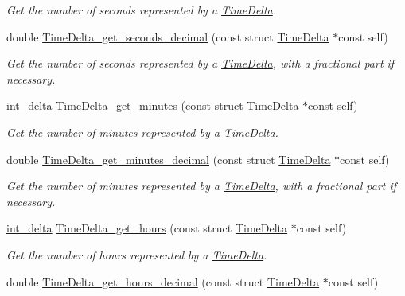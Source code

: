 \begin{DoxyCompactItemize}
\begin{DoxyCompactList}\small\item\em \-Get the number of seconds represented by a \hyperlink{structTimeDelta}{\-Time\-Delta}. \end{DoxyCompactList}\item 
double \hyperlink{time-delta_8h_ac23e1641d7d997d8c9be88a72cf6ee15}{\-Time\-Delta\-\_\-get\-\_\-seconds\-\_\-decimal} (const struct \hyperlink{structTimeDelta}{\-Time\-Delta} $\ast$const self)
\begin{DoxyCompactList}\small\item\em \-Get the number of seconds represented by a \hyperlink{structTimeDelta}{\-Time\-Delta}, with a fractional part if necessary. \end{DoxyCompactList}\item 
\hyperlink{types_8h_a10729255b1946fd4fb654b2fe814910b}{int\-\_\-delta} \hyperlink{time-delta_8h_acd6e692b20c8d6dbb68f83382eb48fbd}{\-Time\-Delta\-\_\-get\-\_\-minutes} (const struct \hyperlink{structTimeDelta}{\-Time\-Delta} $\ast$const self)
\begin{DoxyCompactList}\small\item\em \-Get the number of minutes represented by a \hyperlink{structTimeDelta}{\-Time\-Delta}. \end{DoxyCompactList}\item 
double \hyperlink{time-delta_8h_a2c6277da4b2e51368680acec96f096df}{\-Time\-Delta\-\_\-get\-\_\-minutes\-\_\-decimal} (const struct \hyperlink{structTimeDelta}{\-Time\-Delta} $\ast$const self)
\begin{DoxyCompactList}\small\item\em \-Get the number of minutes represented by a \hyperlink{structTimeDelta}{\-Time\-Delta}, with a fractional part if necessary. \end{DoxyCompactList}\item 
\hyperlink{types_8h_a10729255b1946fd4fb654b2fe814910b}{int\-\_\-delta} \hyperlink{time-delta_8h_ab0df8098dd251b0374f3ec9fbb8d2214}{\-Time\-Delta\-\_\-get\-\_\-hours} (const struct \hyperlink{structTimeDelta}{\-Time\-Delta} $\ast$const self)
\begin{DoxyCompactList}\small\item\em \-Get the number of hours represented by a \hyperlink{structTimeDelta}{\-Time\-Delta}. \end{DoxyCompactList}\item 
double \hyperlink{time-delta_8h_ab30868a5efcd2da10005cb24a72963e6}{\-Time\-Delta\-\_\-get\-\_\-hours\-\_\-decimal} (const struct \hyperlink{structTimeDelta}{\-Time\-Delta} $\ast$const self)

\end{DoxyCompactItemize}
